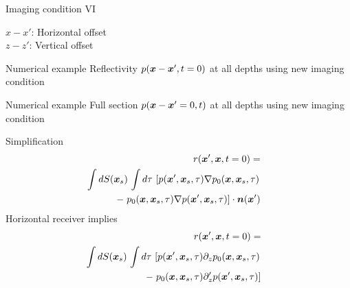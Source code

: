 \documentclass[xcolor=dvipsnames,notes]{beamer}
\begin{document}
\begin{frame}{Imaging condition VI}
\begin{figure}
\end{figure}

$x-x'$: Horizontal offset \\
$z-z'$: Vertical offset 
\end{frame}
\begin{frame}{Numerical example}
Reflectivity $p(\mbox{\boldmath $x$}-\mbox{\boldmath $x$}',t=0)$ at all depths
using new imaging condition
%
\begin{figure}
\end{figure}
\end{frame}
\begin{frame}{Numerical example}
Full section $p(\mbox{\boldmath $x$}-\mbox{\boldmath $x$}'=0,t)$ at all depths
using new imaging condition
%
\begin{figure}
\end{figure}
\end{frame}
\begin{frame}{Simplification}
\begin{eqnarray}
 r(\mbox{\boldmath $x$}',\mbox{\boldmath $x$},t=0)=\nonumber\\
\int dS(\mbox{\boldmath $x$}_s)\, \int d\tau\, \left[p(\mbox{\boldmath $x$}',\mbox{\boldmath $x$}_s,\tau)\nabla p_0(\mbox{\boldmath $x$},\mbox{\boldmath $x$}_s,\tau)\right.\nonumber\\
   -\left. p_0(\mbox{\boldmath $x$},\mbox{\boldmath $x$}_s,\tau)\nabla p(\mbox{\boldmath $x$}',\mbox{\boldmath $x$}_s,\tau)\right]\cdot \mbox{\boldmath $n$}(\mbox{\boldmath $x$}')
&&                   \label{eq:10400}
\end{eqnarray}
Horizontal receiver implies 
\begin{eqnarray}
 r(\mbox{\boldmath $x$}',\mbox{\boldmath $x$},t=0)=\nonumber\\
\int dS(\mbox{\boldmath $x$}_s)\, \int d\tau\, \left[p(\mbox{\boldmath $x$}',\mbox{\boldmath $x$}_s,\tau)\partial_z p_0(\mbox{\boldmath $x$},\mbox{\boldmath $x$}_s,\tau)\right.\nonumber\\
   -\left. p_0(\mbox{\boldmath $x$},\mbox{\boldmath $x$}_s,\tau)\partial_z' p(\mbox{\boldmath $x$}',\mbox{\boldmath $x$}_s,\tau)\right]
&&                   \label{eq:10500}
\end{eqnarray}
\end{frame}
\end{document}
